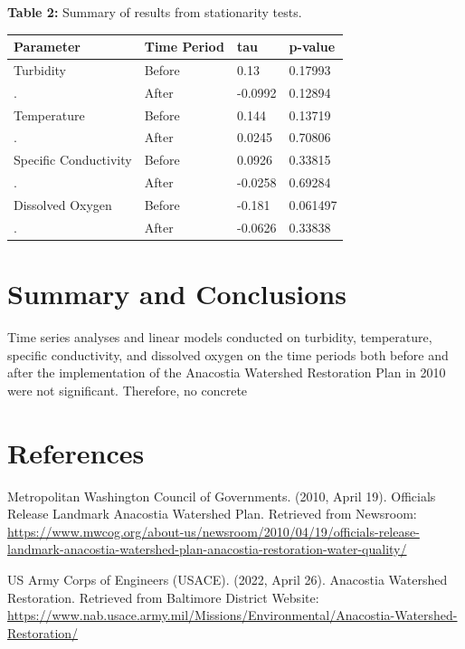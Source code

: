 \documentclass[
  12pt,
]{article}
\begin{document}
\newpage

\textbf{Table 2:} Summary of results from stationarity tests.

\begin{longtable}[]{@{}llll@{}}
\toprule
Parameter & Time Period & tau & p-value \\
\midrule
\endhead
Turbidity & Before & 0.13 & 0.17993 \\
. & After & -0.0992 & 0.12894 \\
Temperature & Before & 0.144 & 0.13719 \\
. & After & 0.0245 & 0.70806 \\
Specific Conductivity & Before & 0.0926 & 0.33815 \\
. & After & -0.0258 & 0.69284 \\
Dissolved Oxygen & Before & -0.181 & 0.061497 \\
. & After & -0.0626 & 0.33838 \\
\bottomrule
\end{longtable}

\newpage

\hypertarget{summary-and-conclusions}{%
\section{Summary and Conclusions}\label{summary-and-conclusions}}

Time series analyses and linear models conducted on turbidity,
temperature, specific conductivity, and dissolved oxygen on the time
periods both before and after the implementation of the Anacostia
Watershed Restoration Plan in 2010 were not significant. Therefore, no
concrete

\newpage

\hypertarget{references}{%
\section{References}\label{references}}

Metropolitan Washington Council of Governments. (2010, April 19).
Officials Release Landmark Anacostia Watershed Plan. Retrieved from
Newsroom:
\url{https://www.mwcog.org/about-us/newsroom/2010/04/19/officials-release-landmark-anacostia-watershed-plan-anacostia-restoration-water-quality/}

US Army Corps of Engineers (USACE). (2022, April 26). Anacostia
Watershed Restoration. Retrieved from Baltimore District Website:
\url{https://www.nab.usace.army.mil/Missions/Environmental/Anacostia-Watershed-Restoration/}
\end{document}
